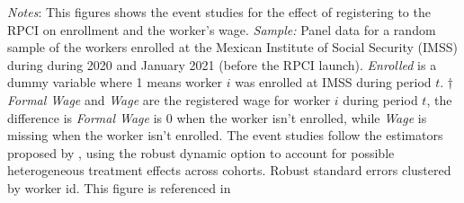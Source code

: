 \documentclass[oneside,11pt]{article}
\begin{document}
\scriptsize{
\noindent \textit{Notes}: This figures shows the event studies for the effect of registering to the RPCI on enrollment and the worker's wage. \textit{Sample:} Panel data for a random sample of the workers enrolled at the Mexican Institute of Social Security (IMSS) during during 2020 and January 2021 (before the RPCI launch). \textit{Enrolled} is a dummy variable where 1 means worker $i$ was enrolled at IMSS during period $t$. $\dagger$ \textit{Formal Wage} and \textit{Wage} are the registered wage for worker $i$ during period $t$, the difference is \textit{Formal Wage} is 0 when the worker isn't enrolled, while \textit{Wage} is missing when the worker isn't enrolled. The event studies follow the estimators proposed by \cite{de2020two}, using the robust dynamic option to account for possible heterogeneous treatment effects across cohorts. Robust standard errors clustered by worker id. This figure is referenced in %
}

\clearpage
\end{document}
